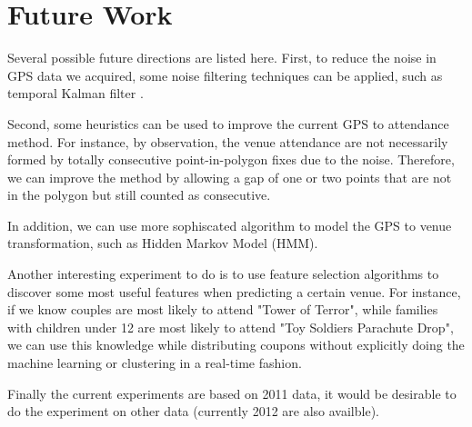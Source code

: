 \documentclass[12pt]{article}
\begin{document}
\section{Future Work}\label{future_work}

Several possible future directions are listed here. First, to reduce the noise in GPS data we acquired, some noise filtering techniques can be applied, such as temporal Kalman filter \cite{Welch95}.

Second, some heuristics can be used to improve the current GPS to attendance method. For instance, by observation, the venue attendance are not necessarily formed by totally consecutive point-in-polygon fixes due to the noise. Therefore, we can improve the method by allowing a gap of one or two points that are not in the polygon but still counted as consecutive.

In addition, we can use more sophiscated algorithm to model the GPS to venue transformation, such as Hidden Markov Model (HMM).

Another interesting experiment to do is to use feature selection algorithms to discover some most useful features when predicting a certain venue. For instance, if we know couples are most likely to attend "Tower of Terror", while families with children under 12 are most likely to attend "Toy Soldiers Parachute Drop", we can use this knowledge while distributing coupons without explicitly doing the machine learning or clustering in a real-time fashion.

Finally the current experiments are based on 2011 data, it would be desirable to do the experiment on other data (currently 2012 are also availble). 



\end{document}
